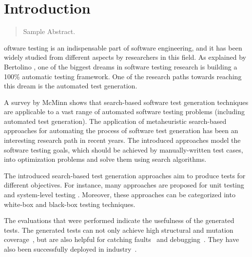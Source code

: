 \chapter{Introduction}
\label{introduction}

\begin{abstract}
Sample Abstract. 
\end{abstract}



\newpage
{}oftware testing is an indispensable part of software engineering, and it has been widely studied from different aspects by researchers in this field. As explained by Bertolino \cite{bertolino2007software}, one of the biggest dreams in software testing research is building a 100\% automatic testing framework. One of the research paths towards reaching this dream is the automated test generation.

A survey by McMinn \cite{McMinn2004} shows that search-based software test generation techniques are applicable to a vast range of automated software testing problems (including automated test generation). The application of metaheuristic search-based approaches for automating the process of software test generation has been an interesting research path in recent years. The introduced approaches model the software testing goals, which should be achieved by manually-written test cases, into optimization problems and solve them using search algorithms. 

The introduced search-based test generation approaches aim to produce tests for different objectives. For instance, many approaches are proposed for unit testing \cite{Fraser2011, braione2017tardis, braione2018sushi, prasetya2013t3} and system-level testing \cite{Arcuri2019, Holler2012, Padhye2019, beyene2012, coppit2005, godefroid2008}. Moreover, these approaches can be categorized into white-box \cite{Fraser2011, braione2017tardis, braione2018sushi, prasetya2013t3, Arcuri2019} and black-box \cite{Holler2012, Padhye2019, beyene2012, coppit2005, godefroid2008} testing techniques. 

The evaluations that were performed indicate the usefulness of the generated tests. The generated tests can not only achieve high structural and mutation coverage~\cite{Panichella2018a, Fraser2014b}, but are also helpful for catching faults~\cite{Shamshiri2016} and debugging~\cite{Ceccato2015}. They have also been successfully deployed in industry~\cite{Alshahwan2018, almasi2017industrial}.

